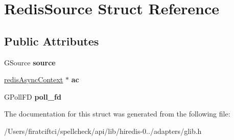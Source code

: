 \hypertarget{struct_redis_source}{}\section{Redis\+Source Struct Reference}
\label{struct_redis_source}
\subsection*{Public Attributes}
\begin{DoxyCompactItemize}
\item 
\mbox{\label{struct_redis_source_a524fa1a913774c654158eeaaa1ef2646}} 
G\+Source {\bfseries source}
\item 
\mbox{\label{struct_redis_source_accf3950d2f35a039f3dce9b07995b63e}} 
\mbox{\hyperlink{structredis_async_context}{redis\+Async\+Context}} $\ast$ {\bfseries ac}
\item 
\mbox{\label{struct_redis_source_a0cd8eea6b8310910d9bdf866f8882377}} 
G\+Poll\+FD {\bfseries poll\+\_\+fd}
\end{DoxyCompactItemize}


The documentation for this struct was generated from the following file\+:\begin{DoxyCompactItemize}
\item 
/\+Users/firatciftci/spellcheck/api/lib/hiredis-\/0../adapters/glib.\+h\end{DoxyCompactItemize}
